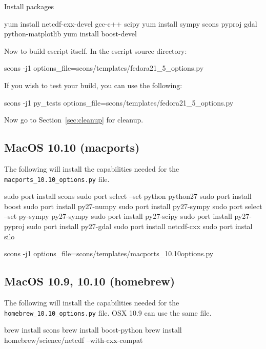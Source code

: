 \noindent Install packages
\begin{shellCode}
yum install netcdf-cxx-devel gcc-c++ scipy 
yum install sympy scons pyproj gdal python-matplotlib 
yum install boost-devel
\end{shellCode}

\noindent Now to build escript itself.
In the escript source directory:
\begin{shellCode}
scons -j1 options_file=scons/templates/fedora21_5_options.py
\end{shellCode}

\noindent If you wish to test your build, you can use the following:
\begin{shellCode}
scons -j1 py_tests options_file=scons/templates/fedora21_5_options.py 
\end{shellCode}

\noindent Now go to Section~\ref{sec:cleanup} for cleanup.

\subsection{MacOS 10.10 (macports)}\label{sec:macportsrc}

The following will install the capabilities needed for the \texttt{macports_10.10_options.py} file.

\begin{shellCode}
sudo port install scons
sudo port select --set python python27
sudo port install boost
sudo port install py27-numpy
sudo port install py27-sympy
sudo port select --set py-sympy py27-sympy
sudo port install py27-scipy
sudo port install py27-pyproj
sudo port install py27-gdal
sudo port install netcdf-cxx
sudo port instal silo
\end{shellCode}

\begin{shellCode}
scons -j1 options_file=scons/templates/macports_10.10options.py 
\end{shellCode}


\subsection{MacOS 10.9, 10.10 (homebrew)}\label{sec:homebrewsrc}

The following will install the capabilities needed for the \texttt{homebrew_10.10_options.py} file.
OSX 10.9 can use the same file.

\begin{shellCode}
brew install scons
brew install boost-python
brew install homebrew/science/netcdf --with-cxx-compat
\end{shellCode}

